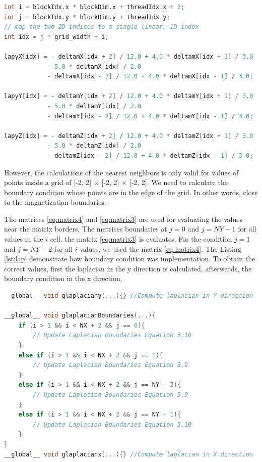 \begin{lstlisting}[language=C++, label={lst:lpay}, caption={Laplacian evaluation for x, y and z coordinate}]
int i = blockIdx.x * blockDim.x + threadIdx.x + 2;
int j = blockIdx.y * blockDim.y + threadIdx.y;
// map the two 2D indices to a single linear, 1D index
int idx = j * grid_width + i;

lapyX[idx] = - deltamX[idx + 2] / 12.0 + 4.0 * deltamX[idx + 1] / 3.0
			- 5.0 * deltamX[idx] / 2.0
			- deltamX[idx - 2] / 12.0 + 4.0 * deltamX[idx - 1] / 3.0;	
			
lapyY[idx] = - deltamY[idx + 2] / 12.0 + 4.0 * deltamY[idx + 1] / 3.0
			- 5.0 * deltamY[idx] / 2.0
			- deltamY[idx - 2] / 12.0 + 4.0 * deltamY[idx - 1] / 3.0;	
			
lapyZ[idx] = - deltamZ[idx + 2] / 12.0 + 4.0 * deltamZ[idx + 1] / 3.0
			- 5.0 * deltamZ[idx] / 2.0
			- deltamZ[idx - 2] / 12.0 + 4.0 * deltamZ[idx - 1] / 3.0;	
\end{lstlisting}


However, the calculations of the nearest neighbors is only valid for values of points inside a grid of [-2, 2] $\times$ [-2, 2] $\times$ [-2, 2]. We need to calculate the boundary condition whose points are in the edge of the grid. In other words, close to the magnetization boundaries.

 The matrices \ref{eq:matrix4} and \ref{eq:matrix3} are used for evaluating the values near the matrix borders. The matrices boundaries at $j = 0$ and $j = NY - 1$ for all values in the $i$ cell, the matrix \ref{eq:matrix3} is evaluates. For the condition $j = 1$ and $j = NY - 2$ for all $i$ values, we used the matrix \ref{eq:matrix4}. The Listing \ref{lst:lap} demonstrate how boundary condition was implementation. To obtain the correct values, first the laplacian in the y direction is calculated, afterwards, the boundary condition in the x direction. 

\begin{lstlisting}[language=C++, label={lst:lap}, caption={Evaluation of Laplacian X, Y with boundary condition}]
__global__ void glaplaciany(...){} //Compute laplacian in Y direction

__global__ void glaplacianBoundaries(...){
    if (i > 1 && i < NX + 2 && j == 0){
     	// Update Laplacian Boundaries Equation 3.10
    }
    else if (i > 1 && i < NX + 2 && j == 1){
  		// Update Laplacian Boundaries Equation 3.9
    }
    else if (i > 1 && i < NX + 2 && j == NY - 2){
        // Update Laplacian Boundaries Equation 3.9
    }
    else if (i > 1 && i < NX + 2 && j == NY - 1){
        // Update Laplacian Boundaries Equation 3.10
    }
}
__global__ void glaplacianx(...){} //Compute laplacian in X direction
\end{lstlisting}


